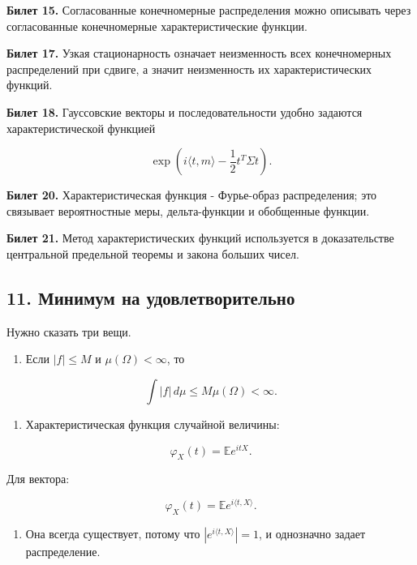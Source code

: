 \documentclass[
  11pt,
  a4paper,
]{article}
\providecommand{\tightlist}{%
  \setlength{\itemsep}{0pt}\setlength{\parskip}{0pt}}
\begin{document}
\textbf{Билет 15.} Согласованные конечномерные распределения можно
описывать через согласованные конечномерные характеристические функции.

\textbf{Билет 17.} Узкая стационарность означает неизменность всех
конечномерных распределений при сдвиге, а значит неизменность их
характеристических функций.

\textbf{Билет 18.} Гауссовские векторы и последовательности удобно
задаются характеристической функцией

\[
\exp\left(i\langle t,m\rangle-\frac12t^T\Sigma t\right).
\]

\textbf{Билет 20.} Характеристическая функция - Фурье-образ
распределения; это связывает вероятностные меры, дельта-функции и
обобщенные функции.

\textbf{Билет 21.} Метод характеристических функций используется в
доказательстве центральной предельной теоремы и закона больших чисел.

\subsection{11. Минимум на
удовлетворительно}\label{ux43cux438ux43dux438ux43cux443ux43c-ux43dux430-ux443ux434ux43eux432ux43bux435ux442ux432ux43eux440ux438ux442ux435ux43bux44cux43dux43e}

Нужно сказать три вещи.

\begin{enumerate}
\def\labelenumi{\arabic{enumi}.}
\tightlist
\item
  Если \(|f|\le M\) и \(\mu(\Omega)<\infty\), то
\end{enumerate}

\[
\int |f|\,d\mu\le M\mu(\Omega)<\infty.
\]

\begin{enumerate}
\def\labelenumi{\arabic{enumi}.}
\setcounter{enumi}{1}
\tightlist
\item
  Характеристическая функция случайной величины:
\end{enumerate}

\[
\varphi_X(t)=\mathbb E e^{itX}.
\]

Для вектора:

\[
\varphi_X(t)=\mathbb E e^{i\langle t,X\rangle}.
\]

\begin{enumerate}
\def\labelenumi{\arabic{enumi}.}
\setcounter{enumi}{2}
\tightlist
\item
  Она всегда существует, потому что \(|e^{i\langle t,X\rangle}|=1\), и
  однозначно задает распределение.
\end{enumerate}
\end{document}
